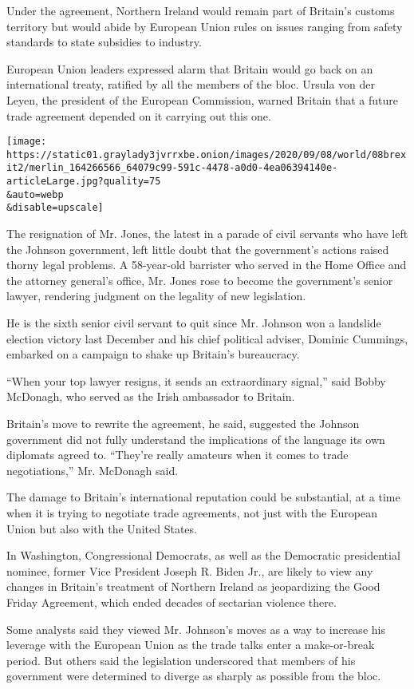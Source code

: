 Under the agreement, Northern Ireland would remain part of Britain's
customs territory but would abide by European Union rules on issues
ranging from safety standards to state subsidies to industry.

European Union leaders expressed alarm that Britain would go back on an
international treaty, ratified by all the members of the bloc. Ursula
von der Leyen, the president of the European Commission, warned Britain
that a future trade agreement depended on it carrying out this one.

\texttt{[image: https://static01.graylady3jvrrxbe.onion/images/2020/09/08/world/08brexit2/merlin\_164266566\_64079c99-591c-4478-a0d0-4ea06394140e-articleLarge.jpg?quality=75\\\&auto=webp\\\&disable=upscale]}

The resignation of Mr. Jones, the latest in a parade of civil servants
who have left the Johnson government, left little doubt that the
government's actions raised thorny legal problems. A 58-year-old
barrister who served in the Home Office and the attorney general's
office, Mr. Jones rose to become the government's senior lawyer,
rendering judgment on the legality of new legislation.

He is the sixth senior civil servant to quit since Mr. Johnson won a
landslide election victory last December and his chief political
adviser, Dominic Cummings, embarked on a campaign to shake up Britain's
bureaucracy.

``When your top lawyer resigns, it sends an extraordinary signal,'' said
Bobby McDonagh, who served as the Irish ambassador to Britain.

Britain's move to rewrite the agreement, he said, suggested the Johnson
government did not fully understand the implications of the language its
own diplomats agreed to. ``They're really amateurs when it comes to
trade negotiations,'' Mr. McDonagh said.

The damage to Britain's international reputation could be substantial,
at a time when it is trying to negotiate trade agreements, not just with
the European Union but also with the United States.

In Washington, Congressional Democrats, as well as the Democratic
presidential nominee, former Vice President Joseph R. Biden Jr., are
likely to view any changes in Britain's treatment of Northern Ireland as
jeopardizing the Good Friday Agreement, which ended decades of sectarian
violence there.

Some analysts said they viewed Mr. Johnson's moves as a way to increase
his leverage with the European Union as the trade talks enter a
make-or-break period. But others said the legislation underscored that
members of his government were determined to diverge as sharply as
possible from the bloc.

